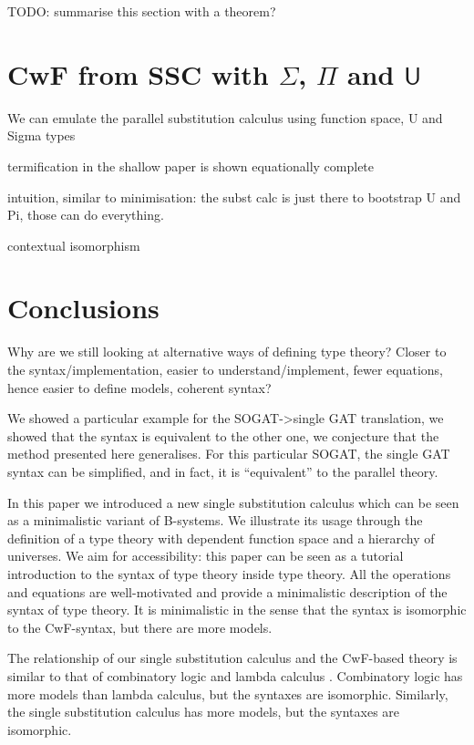 \documentclass[sigplan,10pt,anonymous,review]{acmart}\settopmatter{printfolios=true,printccs=false,printacmref=false}
\newcommand{\U}{\mathsf{U}}
\begin{document}
TODO: summarise this section with a theorem?

\section{CwF from SSC with $\Sigma$, $\Pi$ and $\U$}

We can emulate the parallel substitution calculus using function
space, U and Sigma types

termification in the shallow paper is shown equationally complete

intuition, similar to minimisation: the subst calc is just there to
bootstrap U and Pi, those can do everything. 

contextual isomorphism \cite{DBLP:journals/corr/abs-2211-07487}

\section{Conclusions}
\label{sec:conclusion}

Why are we still looking at alternative ways of defining type theory?
Closer to the syntax/implementation, easier to understand/implement,
fewer equations, hence easier to define models, coherent syntax?

We showed a particular example for the SOGAT->single GAT translation,
we showed that the syntax is equivalent to the other one, we
conjecture that the method presented here generalises. For this
particular SOGAT, the single GAT syntax can be simplified, and in
fact, it is ``equivalent'' to the parallel theory.

In this paper we introduced a new single substitution calculus which
can be seen as a minimalistic variant of B-systems. We illustrate its
usage through the definition of a type theory with dependent function
space and a hierarchy of universes. We aim for accessibility: this
paper can be seen as a tutorial introduction to the syntax of type
theory inside type theory. All the operations and equations are
well-motivated and provide a minimalistic description of the syntax of
type theory. It is minimalistic in the sense that the syntax is
isomorphic to the CwF-syntax, but there are more models. 

The relationship of our single substitution calculus and the CwF-based
theory is similar to that of combinatory logic and lambda calculus
\cite{DBLP:conf/fscd/AltenkirchKSV23}. Combinatory logic has more
models than lambda calculus, but the syntaxes are
isomorphic. Similarly, the single substitution calculus has more
models, but the syntaxes are isomorphic.
\end{document}
